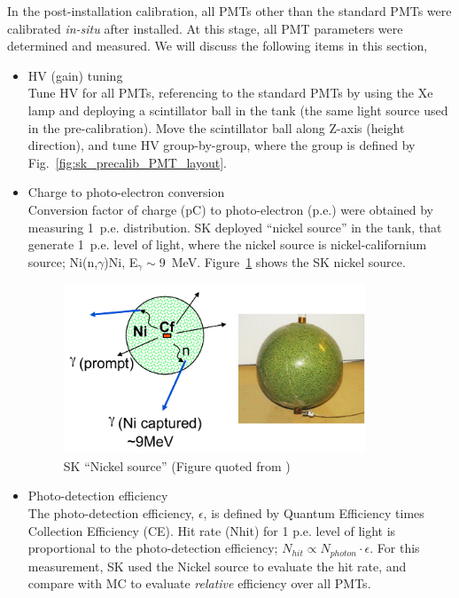 In the post-installation calibration, all PMTs other than the standard PMTs
were calibrated {\it in-situ} after installed.
%
At this stage, all PMT parameters were determined and measured.
We will discuss the following items in this section,
\begin{itemize}
\item HV (gain) tuning\\
  Tune HV for all PMTs, referencing to the standard PMTs by using the Xe lamp and deploying
  a scintillator ball in the tank (the same light source used in the pre-calibration).
  Move the scintillator ball along Z-axis (height direction), and tune HV group-by-group,
  where the group is defined by Fig.~\ref{fig:sk_precalib_PMT_layout}.

\item Charge to photo-electron conversion\\
  Conversion factor of charge (pC) to photo-electron (p.e.) were obtained by measuring 1~p.e.
  distribution.
  SK deployed ``nickel source'' in the tank, that generate 1~p.e. level of light, where the
  nickel source is nickel-californium source; Ni(n,$\gamma$)Ni, E$_{\gamma}\sim$9~MeV.
  Figure~\ref{fig:sk_nickel_source} shows the SK nickel source.
  \begin{figure}[htb]
    \centering
    \includegraphics[width=9cm]{figures/sk_nickel_source.pdf}
    \caption{SK ``Nickel source'' (Figure quoted from \cite{SK_calib_paper})}
    \label{fig:sk_nickel_source}
  \end{figure}

\item Photo-detection efficiency\\
  The photo-detection efficiency, $\epsilon$, is defined by Quantum Efficiency times Collection
  Efficiency (CE).
  Hit rate (Nhit) for 1 p.e. level of light is proportional to the photo-detection efficiency;
  $N_{hit} \propto N_{photon} \cdot \epsilon$.
  For this measurement, SK used the Nickel source to evaluate the hit rate, and compare with MC
  to evaluate {\it relative} efficiency over all PMTs.
  

\end{itemize}
